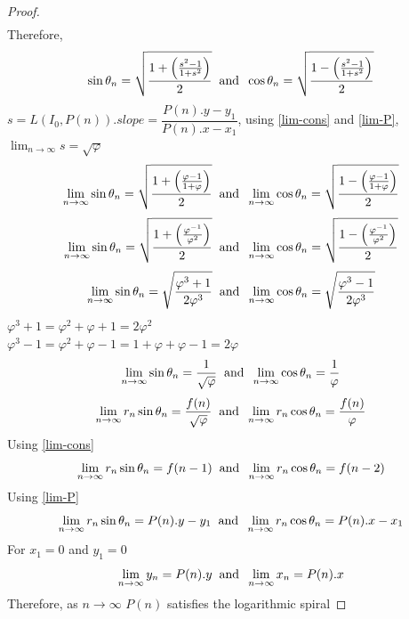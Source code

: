 \documentclass[preprint,12pt]{elsarticle}
\begin{document}
\begin{proof}
\begin{align*}
		\end{align*}
		Therefore, $$\sin\theta_n = \sqrt{\dfrac{1 + \left(\frac{s^2-1}{1+s^2}\right)}{2}}\hspace{2mm}\text{and}\hspace{2mm}\cos\theta_n = \sqrt{\dfrac{1 - \left(\frac{s^2-1}{1+s^2}\right)}{2}}$$
		$s = L(I_0, P(n)).slope = \dfrac{P(n).y - y_1}{P(n).x - x_1}$, using \ref{lim-cons} and \ref{lim-P}, $\lim_{n \to \infty} s = \sqrt{\varphi}$
		$$\lim_{n \to \infty}\sin\theta_n = \sqrt{\dfrac{1 + \left(\frac{\varphi-1}{1+\varphi}\right)}{2}}\hspace{2mm}\text{and}\hspace{2mm}\lim_{n \to \infty}\cos\theta_n = \sqrt{\dfrac{1 - \left(\frac{\varphi-1}{1+\varphi}\right)}{2}}$$
		$$\lim_{n \to \infty}\sin\theta_n = \sqrt{\dfrac{1 + \left(\frac{\varphi^{-1}}{\varphi^2}\right)}{2}}\hspace{2mm}\text{and}\hspace{2mm}\lim_{n \to \infty}\cos\theta_n = \sqrt{\dfrac{1 - \left(\frac{\varphi^{-1}}{\varphi^2}\right)}{2}}$$
		$$\lim_{n \to \infty}\sin\theta_n = \sqrt{\dfrac{\varphi^3+1}{2\varphi^3}}\hspace{2mm}\text{and}\hspace{2mm}\lim_{n \to \infty}\cos\theta_n = \sqrt{\dfrac{\varphi^3-1}{2\varphi^3}}$$
		$\varphi^3+1 = \varphi^2+\varphi+1=2\varphi^2$\\
		$\varphi^3-1 = \varphi^2+\varphi-1=1+\varphi + \varphi -1 = 2\varphi$
		$$\lim_{n \to \infty}\sin\theta_n = \dfrac{1}{\sqrt{\varphi}}\hspace{2mm}\text{and}\hspace{2mm}\lim_{n \to \infty}\cos\theta_n = \dfrac{1}{\varphi}$$
		$$\lim_{n \to \infty}r_n\sin\theta_n = \dfrac{f(n)}{\sqrt{\varphi}}\hspace{2mm}\text{and}\hspace{2mm}\lim_{n \to \infty}r_n\cos\theta_n = \dfrac{f(n)}{\varphi}$$
		Using \ref{lim-cons} $$\lim_{n \to \infty}r_n\sin\theta_n = f(n-1)\hspace{2mm}\text{and}\hspace{2mm}\lim_{n \to \infty}r_n\cos\theta_n = f(n-2)$$
		Using \ref{lim-P} $$\lim_{n \to \infty}r_n\sin\theta_n = P(n).y-y_1\hspace{2mm}\text{and}\hspace{2mm}\lim_{n \to \infty}r_n\cos\theta_n = P(n).x-x_1$$
		For $x_1 = 0$ and $y_1 = 0$
		$$\lim_{n \to \infty}y_n = P(n).y\hspace{2mm}\text{and}\hspace{2mm}\lim_{n \to \infty}x_n = P(n).x$$
		Therefore, as $n \to \infty$ $P(n)$ satisfies the logarithmic spiral
	\end{proof}
\end{document}
